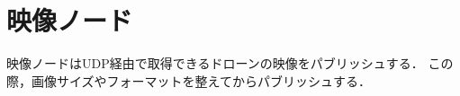\section{映像ノード}
\label{proposed_video}
映像ノードはUDP経由で取得できるドローンの映像をパブリッシュする．
この際，画像サイズやフォーマットを整えてからパブリッシュする．

